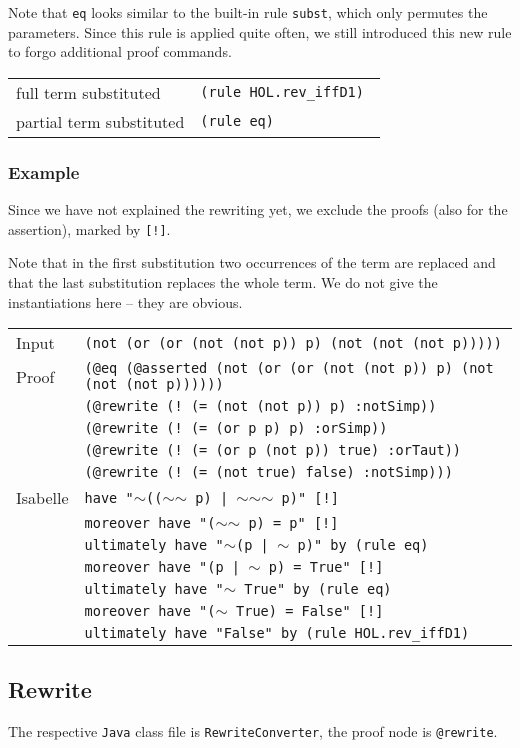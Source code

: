 \documentclass[10pt,a4paper]{article}
\newcommand{\jav}{\texttt{Java}\xspace}
\newcommand{\ttt}{\texttt}
\newcommand{\negat}{\ensuremath{\sim}}
\newcommand{\nega}{\negat\xspace}
\newenvironment{rt}{\begin{center}\begin{tabular}{|l l|}\hline}{\end{tabular}\end{center}}
\newcommand{\rl}[2]{\rm{#1} & \tt{#2} \\[1mm]}
\newcommand{\rll}[2]{\rm{#1} & \tt{#2} \\\hline}
\def\ind{\quad}
\newcommand{\exl}[2]{\exlm{#1}{\ttt{#2}}}
\newcommand{\exlm}[2]{#1 & #2 \\[1mm]}
\begin{document}
Note that \ttt{eq} looks similar to the built-in rule \ttt{subst}, which only permutes the parameters. Since this rule is applied quite often, we still introduced this new rule to forgo additional proof commands.
%
\begin{rt}
	\rl{full term substituted}{(rule HOL.rev\_iffD1)}
	\rll{partial term substituted}{(rule eq)}
\end{rt}
%
\subsubsection*{Example}
Since we have not explained the rewriting yet, we exclude the proofs (also for the assertion), marked by \ttt{[!]}.

Note that in the first substitution two occurrences of the term are replaced and that the last substitution replaces the whole term. We do not give the instantiations here -- they are obvious.
%
\begin{center}
	\begin{tabular}{ll}
		\exl{Input}{(not (or (or (not (not p)) p) (not (not (not p)))))}
		\exlm{Proof}{\ttt{(@eq (@asserted (not (or (or (not (not p)) p) (not (not (not p))))))} \\
			& \ind \ttt{(@rewrite (! (= (not (not p)) p) :notSimp))} \\
			& \ind \ttt{(@rewrite (! (= (or p p) p) :orSimp))} \\
			& \ind \ttt{(@rewrite (! (= (or p (not p)) true) :orTaut))} \\
			& \ind \ttt{(@rewrite (! (= (not true) false) :notSimp)))}}
		\exlm{Isabelle}{\ttt{have "\nega ((\nega \nega p) | \nega \nega \nega p)" [!]} \\
			& \ttt{moreover have "(\nega \nega p) = p" [!]} \\
			& \ind \ttt{ultimately have "\nega (p | \nega p)" by (rule eq)} \\
			& \ttt{moreover have "(p | \nega p) = True" [!]} \\
			& \ind \ttt{ultimately have "\nega True" by (rule eq)} \\
			& \ttt{moreover have "(\nega True) = False" [!]} \\
			& \ind \ttt{ultimately have "False" by (rule HOL.rev\_iffD1)}}
	\end{tabular}
\end{center}
%
\subsection{Rewrite}\label{sec:rewrite}
The respective \jav class file is \ttt{RewriteConverter}, the proof node is \ttt{@rewrite}.
%
\end{document}
